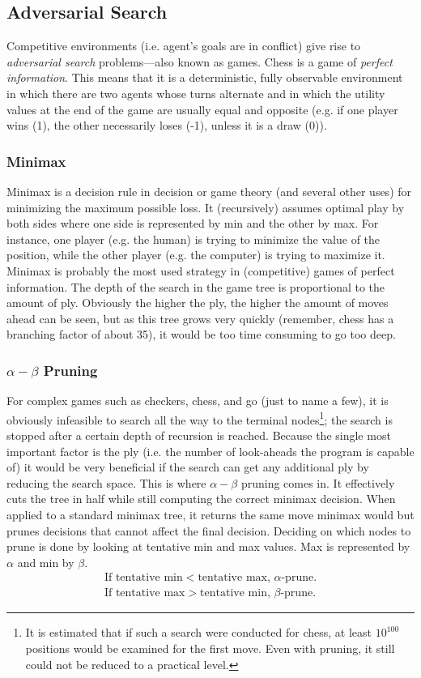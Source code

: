 \documentclass[11pt,letterpaper,twocolumn]{article}
\begin{document}
\subsection{Adversarial Search}
Competitive environments (i.e. agent's goals are in conflict) give rise to \emph{adversarial search} problems---also known as games.
Chess is a game of \emph{perfect information}. This means that it is a deterministic, fully observable environment in which there are two agents whose turns alternate
and in which the utility values at the end of the game are usually equal and opposite (e.g. if one player wins (1), the other necessarily loses (-1), unless it is a
draw (0)).

\subsubsection{Minimax}
Minimax is a decision rule in decision or game theory (and several other uses) for minimizing the maximum possible loss. It (recursively) assumes optimal 
play by both sides where one side is represented by min and the other by max. For instance, one player (e.g. the human) is trying to minimize the value of the position,
while the other player (e.g. the computer) is trying to maximize it. Minimax is probably the most used strategy in (competitive) games of perfect information.
The depth of the search in the game tree is proportional to the amount of ply. Obviously the higher the ply, the higher the amount of moves ahead can be seen,
but as this tree grows very quickly (remember, chess has a branching factor of about 35), it would be too time consuming to go too deep.

\subsubsection{$\alpha-\beta{}$ Pruning}
For complex games such as checkers, chess, and go (just to name a few), it is obviously infeasible to search all the way to the terminal nodes\footnote{It is estimated
that if such a search were conducted for chess, at least $10^{100}$ positions would be examined for the first move. Even with pruning, it still could not be reduced
to a practical level.}; the search is stopped after a certain depth of recursion is reached. Because the single most important factor is the ply (i.e. the number
of look-aheads the program is capable of) it would be very beneficial if the search can get any additional ply by reducing the search space.
This is where $\alpha-\beta{}$ pruning comes in. It effectively cuts the tree in half while still computing the correct minimax decision.
When applied to a standard minimax tree, it returns the same move minimax would but prunes decisions that cannot affect the final decision.
Deciding on which nodes to prune is done by looking at tentative min and max values. Max is represented by $\alpha$ and min by $\beta$.
\begin{eqnarray}
 \mbox{If tentative min} < \mbox{tentative max, } \alpha \mbox{-prune.}\\
\mbox{If tentative max} > \mbox{tentative min, } \beta \mbox{-prune.}
\label{alpha-beta}
\end{eqnarray}
\end{document}
